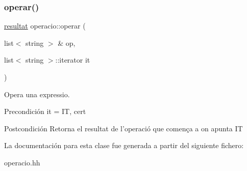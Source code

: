 \subsubsection{\texorpdfstring{operar()}{operar()}}
{\footnotesize\ttfamily \hyperlink{classresultat}{resultat} operacio\+::operar (\begin{DoxyParamCaption}\item[{list$<$ string $>$ \&}]{op,  }\item[{list$<$ string $>$\+::iterator}]{it }\end{DoxyParamCaption})}



Opera una expressio. 

\begin{DoxyPrecond}{Precondición}
it = IT, cert 
\end{DoxyPrecond}
\begin{DoxyPostcond}{Postcondición}
Retorna el resultat de l’operació que comença a on apunta IT 
\end{DoxyPostcond}


La documentación para esta clase fue generada a partir del siguiente fichero\+:\begin{DoxyCompactItemize}
\item 
operacio.\+hh\end{DoxyCompactItemize}
